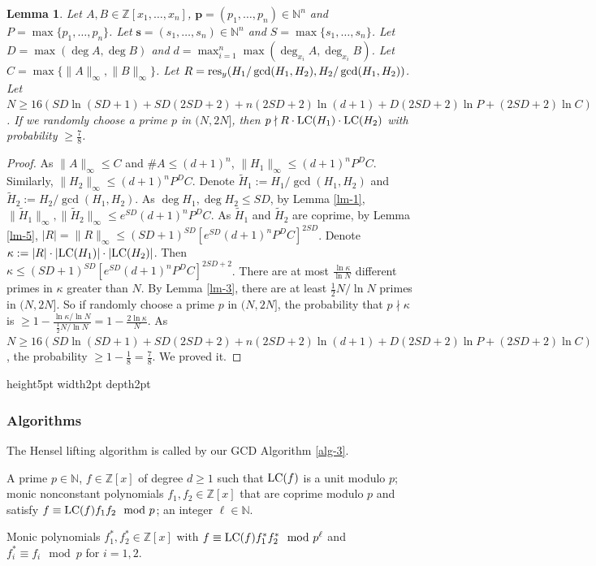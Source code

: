 \documentclass[final,20pt]{elsarticle}
\newtheorem{lemma}[theorem]{Lemma}
\def\N{{\mathbb N}}
\def\Z{{\mathbb Z}}
\def\res{\hbox{\rm{res}}}
\def\LC{\hbox{\rm{LC}}}
\def\qed{\hfil {\vrule height5pt width2pt depth2pt}}
\begin{document}
\begin{lemma}\label{lm-9}
Let $A,B\in \Z[x_1,\dots,x_n]$, $\mathbf{p} =(p_1,\dots,p_n)\in\N^n$ and $P=\max\{p_1,\dots,p_n\}$. Let $\mathbf{s}=(s_1,\dots,s_n)\in\N^n$ and $S=\max\{s_1,\dots,s_n\}$. Let $D= \max(\deg A,\deg B)$ and $d=\max_{i=1}^n \max(\deg_{x_i}A,\deg_{x_i}B)$. Let $C=\max \{\|A\|_{\infty},\|B\|_{\infty}\}$. Let $R=\res_{y}(H_1/\gcd(H_1,H_2),H_2/\gcd(H_1,H_2))$.  Let $N\geq 16(SD\ln(SD+1)+SD(2SD+2)+n(2SD+2)\ln(d+1)+D(2SD+2)\ln P+(2SD+2)\ln C)$. If we randomly choose a prime $p$ in $(N,2N]$, then $p\nmid R\cdot \LC(H_1)\cdot \LC(H_2)$ with probability $\geq \frac{7}{8}$.
\end{lemma}

\begin{proof}
As $\|A\|_{\infty}\leq C$ and $\#A\leq (d+1)^n$, $\|H_1\|_{\infty}\leq (d+1)^nP^DC$. Similarly, $\|H_2\|_{\infty}\leq (d+1)^nP^DC$. Denote $\widetilde{H}_1:=H_1/\gcd(H_1,H_2)$ and $\widetilde{H}_2:=H_2/\gcd(H_1,H_2)$. As $\deg H_1,\deg H_2\leq SD$, by Lemma \ref{lm-1}, $\|\widetilde{H}_1\|_{\infty},\|\widetilde{H}_2\|_{\infty}\leq  e^{SD}(d+1)^nP^DC$. As $\widetilde{H}_1$ and $\widetilde{H}_2$ are coprime, by Lemma \ref{lm-5}, $|R|=\|R\|_{\infty}\leq (SD+1)^{SD}[e^{SD}(d+1)^nP^DC]^{2SD}$.
Denote $\kappa:=|R|\cdot |\LC(H_1)|\cdot |\LC(H_2)|$.
Then $\kappa\leq (SD+1)^{SD}[e^{SD}(d+1)^nP^DC]^{2SD+2}$.
%
There are at most $\frac{\ln \kappa}{\ln N}$ different primes in $\kappa$ greater than $N$. By Lemma \ref{lm-3}, there are at least $\frac12N/\ln N$ primes in $(N,2N]$. So if randomly choose a prime $p$ in $(N,2N]$, the probability that $p\nmid \kappa$ is $\geq 1-\frac{\ln \kappa/\ln N}{\frac{1}{2}N/\ln N}=1-\frac{2\ln \kappa}{ N}$. As $N\geq 16(SD\ln(SD+1)+SD(2SD+2)+n(2SD+2)\ln(d+1)+D(2SD+2)\ln P+(2SD+2)\ln C)$, the probability $\geq 1-\frac{1}{8}=\frac{7}{8}$.
%
We proved it.
\end{proof}\qed


\subsubsection{Algorithms}

The Hensel lifting algorithm is called by our GCD Algorithm \ref{alg-3}.


\begin{algorithm}[H]
\caption{Hensel lifting \cite[Alg. 15.17]{GaGer13}}\label{alg-2}
\begin{algorithmic}
\REQUIRE A prime $p\in \N$, $f\in \Z[x]$ of degree $d\geq 1$ such that $\LC(f)$ is a unit modulo $p$;
monic nonconstant polynomials $f_1,f_2\in \Z[x]$ that are coprime modulo $p$ and satisfy $f\equiv \LC(f)f_1 f_2 \mod p$; an integer $\ell \in \N$.

\ENSURE Monic polynomials $f^*_1,f^*_2\in \Z[x]$ with  $f\equiv \LC(f)f^*_1 f^*_2 \mod p^{\ell}$ and $f^*_i\equiv f_i \mod p$ for $i=1,2$.
\end{algorithmic}
\end{algorithm}
\end{document}
